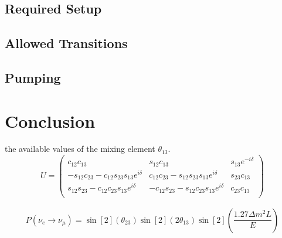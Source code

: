 \documentclass[letter,12pt]{article}
\begin{document}
	\subsection{Required Setup}

	\subsection{Allowed Transitions}

	\subsection{Pumping}

\section{Conclusion}

the available values of the mixing element $\theta_{13}$.
\begin{equation}
	U=
	\begin{pmatrix}
		c_{12}c_{13} & s_{12}c_{13} & s_{13}e^{-i\delta}\\
		-s_{12}c_{23} -c_{12}s_{23}s_{13}e^{i\delta} & c_{12}c_{23} -s_{12}s_{23}s_{13}e^{i\delta} & s_{23}c_{13}\\
		s_{12}s_{23} -c_{12}c_{23}s_{13}e^{i\delta} & -c_{12}s_{23} -s_{12}c_{23}s_{13}e^{i\delta} & c_{23}c_{13}\\
	\end{pmatrix}
\end{equation}

\begin{equation}
	\begin{aligned}
		P(\nu_e \rightarrow \nu_\mu) = \sin[2](\theta_{23})\sin[2](2\theta_{13})
		\sin[2](\dfrac{1.27\Delta m^2L}{E})
	\end{aligned}
\end{equation}



\end{document}
